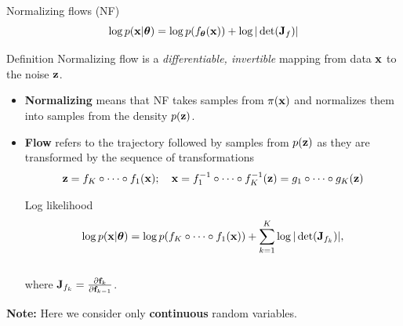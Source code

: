 \begin{frame}{Normalizing flows (NF)}
	\vspace{-0.3cm}
	\[
	\log p(\mathbf{x}|\boldsymbol{\theta}) = \log p(f_{\boldsymbol{\theta}}(\mathbf{x})) + \log |\det (\mathbf{J}_f)|
	\]
	\vspace{-0.4cm}
	\begin{block}{Definition}
		Normalizing flow is a \textit{differentiable, invertible} mapping from data $\mathbf{x}$ to the noise $\mathbf{z}$. 
	\end{block}
	\begin{itemize}
		\item \textbf{Normalizing} means that NF takes samples from $\pi(\mathbf{x})$ and normalizes them into samples from the density $p(\mathbf{z})$.
		\item \textbf{Flow} refers to the trajectory followed by samples from $p(\mathbf{z})$ as they are transformed by the sequence of transformations
		\[
		\mathbf{z} = f_K \circ \dots \circ f_1(\mathbf{x}); \quad \mathbf{x} = f_1^{-1} \circ \dots \circ f_K^{-1} (\mathbf{z}) = g_1 \circ \dots \circ g_K(\mathbf{z}) 
		\] 
		\vspace{-0.4cm}
		\begin{block}{Log likelihood}
			\vspace{-0.4cm}
			\[
			\log p(\mathbf{x} | \boldsymbol{\theta}) = \log p(f_K \circ \dots \circ f_1(\mathbf{x})) + \sum_{k=1}^K\log |\det (\mathbf{J}_{f_k})|,
			\]
			\vspace{-0.4cm} \\
			where $\mathbf{J}_{f_k} = \frac{\partial \mathbf{f}_k}{\partial \mathbf{f}_{k-1}}$.
		\end{block}
	\end{itemize}
	\textbf{Note:} Here we consider only \textbf{continuous} random variables.
\end{frame}
